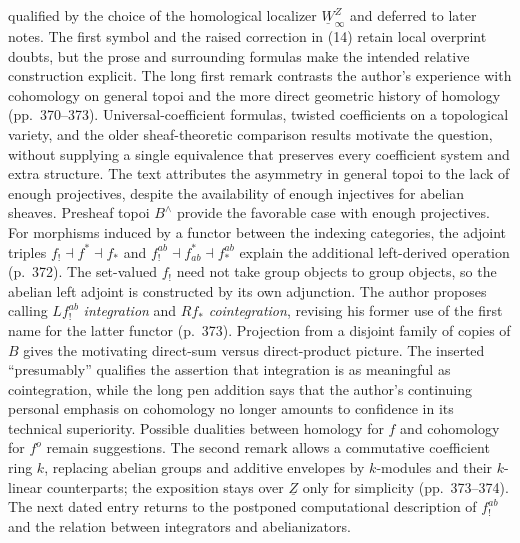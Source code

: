 qualified by the choice of the homological localizer $\underline W_{\infty}^{Z}$ and deferred to later notes. The first symbol and the raised correction in (14) retain local overprint doubts, but the prose and surrounding formulas make the intended relative construction explicit. The long first remark contrasts the author's experience with cohomology on general topoi and the more direct geometric history of homology (pp.~370--373). Universal-coefficient formulas, twisted coefficients on a topological variety, and the older sheaf-theoretic comparison results motivate the question, without supplying a single equivalence that preserves every coefficient system and extra structure. The text attributes the asymmetry in general topoi to the lack of enough projectives, despite the availability of enough injectives for abelian sheaves. Presheaf topoi $B^{\wedge}$ provide the favorable case with enough projectives. For morphisms induced by a functor between the indexing categories, the adjoint triples $f_!\dashv f^*\dashv f_*$ and $f_!^{ab}\dashv f^*_{ab}\dashv f_*^{ab}$ explain the additional left-derived operation (p.~372). The set-valued $f_!$ need not take group objects to group objects, so the abelian left adjoint is constructed by its own adjunction. The author proposes calling $Lf_!^{ab}$ \emph{integration} and $Rf_*$ \emph{cointegration}, revising his former use of the first name for the latter functor (p.~373). Projection from a disjoint family of copies of $B$ gives the motivating direct-sum versus direct-product picture. The inserted ``presumably'' qualifies the assertion that integration is as meaningful as cointegration, while the long pen addition says that the author's continuing personal emphasis on cohomology no longer amounts to confidence in its technical superiority. Possible dualities between homology for $f$ and cohomology for $f^o$ remain suggestions. The second remark allows a commutative coefficient ring $k$, replacing abelian groups and additive envelopes by $k$-modules and their $k$-linear counterparts; the exposition stays over $\underline Z$ only for simplicity (pp.~373--374). The next dated entry returns to the postponed computational description of $f_!^{ab}$ and the relation between integrators and abelianizators.

